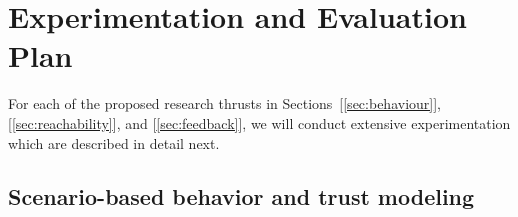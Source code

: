 
\section{Experimentation and Evaluation Plan}
For each of the proposed research thrusts in Sections~[\ref{sec:behaviour}],[\ref{sec:reachability}], and [\ref{sec:feedback}], we will conduct extensive experimentation 
which are described in detail next.

\subsection{Scenario-based behavior and trust modeling}
\label{subsec:trust-modeling}



